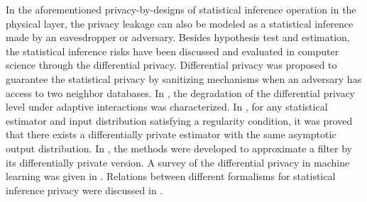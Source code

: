 In the aforementioned privacy-by-designs of statistical inference operation in the physical layer, the privacy leakage can also be modeled as a statistical inference made by an eavesdropper or adversary. Besides hypothesis test and estimation, the statistical inference risks have been discussed and evaluated in computer science through the differential privacy. Differential privacy \cite{dwork2006} was proposed to guarantee the statistical privacy by sanitizing mechanisms when an adversary has access to two neighbor databases. In \cite{kairouz2015}, the degradation of the differential privacy level under adaptive interactions was characterized. In \cite{smith2011}, for any statistical estimator and input distribution satisfying a regularity condition, it was proved that there exists a differentially private estimator with the same asymptotic output distribution. In \cite{leny2014}, the methods were developed to approximate a filter by its differentially private version. A survey of the differential privacy in machine learning was given in \cite{ji}. Relations between different formalisms for statistical inference privacy were discussed in \cite{barber}.


